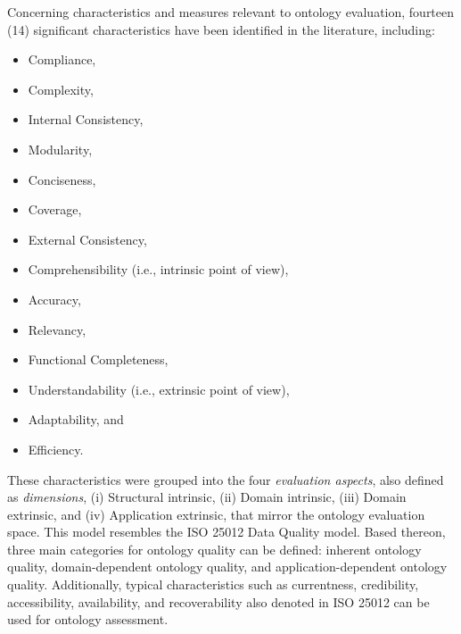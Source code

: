 Concerning characteristics and measures relevant to ontology evaluation, fourteen (14) significant characteristics have been identified in the literature, including:
\begin{itemize}
  \item Compliance,
  \item Complexity,
  \item Internal Consistency,
  \item Modularity,
  \item Conciseness,
  \item Coverage,
  \item External Consistency,
  \item Comprehensibility (i.e., intrinsic point of view),
  \item Accuracy,
  \item Relevancy,
  \item Functional Completeness,
  \item Understandability (i.e., extrinsic point of view),
  \item Adaptability, and
  \item Efficiency.
\end{itemize}
These characteristics were grouped into the four \textit{evaluation aspects}, also defined as \textit{dimensions}, (i) Structural intrinsic, (ii) Domain intrinsic, (iii) Domain extrinsic, and (iv) Application extrinsic, that mirror the ontology evaluation space. This model resembles the ISO 25012 Data Quality model. Based thereon, three main categories for ontology quality can be defined: inherent ontology quality, domain-dependent ontology quality, and application-dependent ontology quality. Additionally, typical characteristics such as currentness, credibility, accessibility, availability, and recoverability also denoted in ISO 25012 can be used for ontology assessment.

\label{ssec:using-protege}